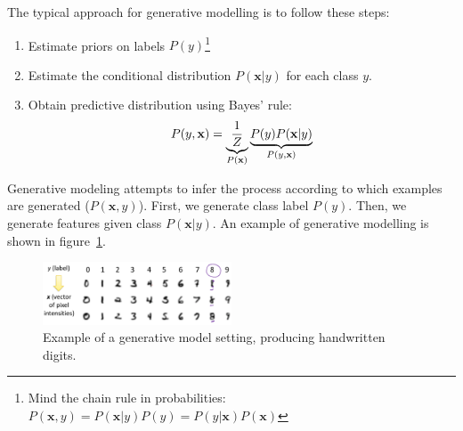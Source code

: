 \documentclass[a4paper,10pt,twoside]{article}
\begin{document}
The typical approach for generative modelling is to follow these steps:
\begin{enumerate}
\item Estimate priors on labels $P(y)$\footnote{Mind the chain rule in probabilities: $P(\mathbf{x},y)=P(\mathbf{x}|y)P(y)=P(y|\mathbf{x})P(\mathbf{x})$}
\item Estimate the conditional distribution $P(\mathbf{x}|y)$ for each class $y$.
\item Obtain predictive distribution using Bayes' rule:
  \begin{equation*}
    P(y,\mathbf{x})=\underbrace{{1\over Z}}_{P(\mathbf{x})}\underbrace{P(y)P(\mathbf{x}|y)}_{P(y,\mathbf{x})}
  \end{equation*}
\end{enumerate}

Generative modeling attempts to infer the process according to which examples are generated ($P(\mathbf{x},y)$). First, we generate class label $P(y)$. Then, we generate features given class $P(\mathbf{x}|y)$. An example of generative modelling is shown in figure~\ref{fig:example_generative_modelling}.

\begin{figure}
  \centering
  \includegraphics[width=0.5\textwidth]{figures/example_generative_modelling.png}
  \caption{Example of a generative model setting, producing handwritten digits.}
  \label{fig:example_generative_modelling}
\end{figure}
\end{document}
